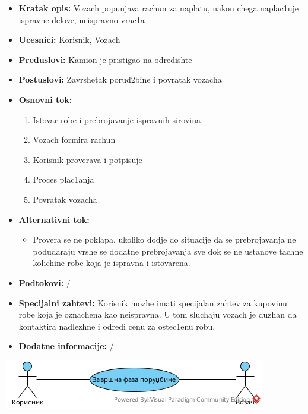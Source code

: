 \begin{itemize}
	\item {\textbf{Kratak opis:}  Vozach popunjava rachun za naplatu, nakon chega naplac1uje ispravne delove, neispravno vrac1a}
	\item{\textbf{Ucesnici:} Korisnik, Vozach }
	\item{\textbf{Preduslovi:} Kamion je pristigao na odredishte }
	\item{\textbf{Postuslovi:} Zavrshetak porud2bine i povratak vozacha}
	\item{\textbf{Osnovni tok:}  \begin{enumerate}
				\item {Istovar robe i prebrojavanje ispravnih sirovina}
				\item {Vozach formira rachun}
				\item {Korisnik proverava i potpisuje}
				\item {Proces plac1anja}
				\item {Povratak vozacha}
	\end{enumerate}}
\item{\textbf{Alternativni tok:} \begin{itemize}
		\item{Provera se ne poklapa, ukoliko dodje do situacije da se prebrojavanja ne podudaraju vrshe se dodatne prebrojavanja sve dok se ne ustanove tachne kolichine robe koja je ispravna i istovarena.}
	\end{itemize}}
\item{\textbf{Podtokovi:} /}
\item{\textbf{Specijalni zahtevi:} Korisnik mozhe imati specijalan zahtev za kupovinu robe koja je oznachena kao neispravna. U tom sluchaju vozach je duzhan da kontaktira nadlezhne i odredi cenu za ostec1enu robu.}
\item{\textbf{Dodatne informacije:} /}
\end{itemize}
\includegraphics{Slike/SUzavrsnaFazaPorudzbine.jpg}